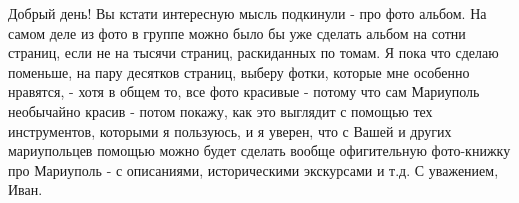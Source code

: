  
 
 
 
 


Добрый день! Вы кстати интересную мысль подкинули - про фото альбом. На самом
деле из фото в группе можно было бы уже сделать альбом на сотни страниц, если
не на тысячи страниц, раскиданных по томам. Я пока что сделаю поменьше, на пару
десятков страниц, выберу фотки, которые мне особенно нравятся, - хотя в общем
то, все фото красивые - потому что сам Мариуполь необычайно красив - потом
покажу, как это выглядит с помощью тех инструментов, которыми я пользуюсь, и я
уверен, что с Вашей и других мариупольцев помощью можно будет сделать вообще
офигительную фото-книжку про Мариуполь - с описаниями, историческими экскурсами
и т.д. С уважением, Иван.
